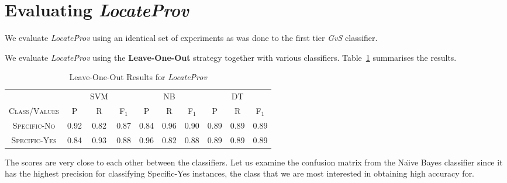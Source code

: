 %



\section{Evaluating {\it LocateProv}}
\label{eval:second}
We evaluate {\it LocateProv} using an identical set of experiments as was done to the first tier {\it GvS} classifier.

We evaluate \textit{LocateProv} using the \textbf{Leave-One-Out} strategy together with various classifiers. Table~\ref{tab:secondtieresults} summarises the results.

\begin{table}[h]
	\center
	\begin{tabular}{ c | c  c  c | c c c | c c c}
		& & SVM & & & NB & & & DT \\
		\textsc{Class/Values} & \textsc{P} & \textsc{R} & \textsc{F$_1$} & \textsc{P} & \textsc{R} & \textsc{F$_1$} & \textsc{P} & \textsc{R} & \textsc{F$_1$} \\
		\hline
		\textsc{Specific-No} 			& 0.92  &    0.82   &   0.87 & 0.84   &   0.96   &   0.90 & 0.89  &    0.89  &    0.89 \\
		\textsc{Specific-Yes} 			& 0.84  &    0.93   &   0.88 & 0.96   &   0.82   &   0.88 & 0.89  &    0.89  &    0.89 \\
	\end{tabular}
	\caption{Leave-One-Out Results for {\it LocateProv}}
	\label{tab:secondtieresults}
\end{table}
The scores are very close to each other between the classifiers. 
Let us examine the confusion matrix from the Na\"{\i}ve Bayes classifier since it has the highest precision for classifying Specific-Yes instances, the class that we are most interested in obtaining high accuracy for.

